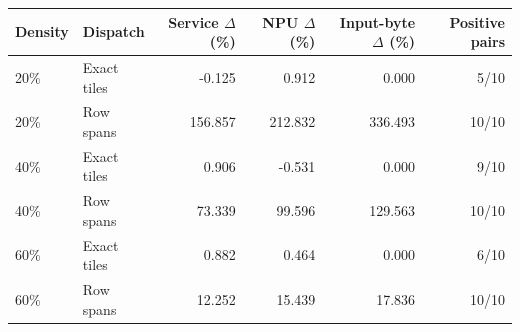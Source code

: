 \begin{tabular}{@{}llrrrr@{}}
\toprule
Density & Dispatch & Service $\Delta$ (\%) & NPU $\Delta$ (\%) & Input-byte $\Delta$ (\%) & Positive pairs \\
\midrule
20\% & Exact tiles & -0.125 & 0.912 & 0.000 & 5/10 \\
20\% & Row spans & 156.857 & 212.832 & 336.493 & 10/10 \\
40\% & Exact tiles & 0.906 & -0.531 & 0.000 & 9/10 \\
40\% & Row spans & 73.339 & 99.596 & 129.563 & 10/10 \\
60\% & Exact tiles & 0.882 & 0.464 & 0.000 & 6/10 \\
60\% & Row spans & 12.252 & 15.439 & 17.836 & 10/10 \\
\bottomrule
\end{tabular}
